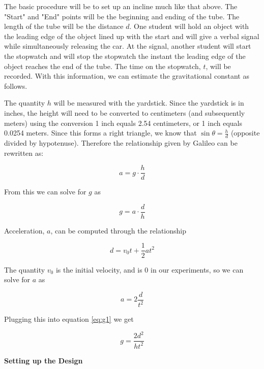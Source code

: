 \documentclass[12pt]{article}
\begin{document}
The basic procedure will be to set up an incline much like that above. The "Start" and "End" points will be the beginning and ending of the tube. The length of the tube will be the distance $d$. One student will hold an object with the leading edge of the object lined up with the start and will give a verbal signal while simultaneously releasing the car. At the signal, another student will start the stopwatch and will stop the stopwatch the instant the leading edge of the object reaches the end of the tube. The time on the stopwatch, $t$, will be recorded. With this information, we can estimate the gravitational constant as follows.

The quantity $h$ will be measured with the yardstick. Since the yardstick is in inches, the height will need to be converted to centimeters (and subsequently meters) using the conversion 1 inch equals 2.54 centimeters, or 1 inch equals 0.0254 meters. Since this forms a right triangle, we know that $\sin{\theta} = \frac{h}{d}$ (opposite divided by hypotenuse). Therefore the relationship given by Galileo can be rewritten as:

\begin{equation}
	a = g \cdot \frac{h}{d}
\end{equation}

\noindent From this we can solve for $g$ as

\begin{equation}
	g = a \cdot \frac{d}{h}
	\label{eq:g1}
\end{equation}

\noindent Acceleration, $a$, can be computed through the relationship

\begin{equation}
	d = v_0t + \frac{1}{2}at^2
\end{equation}

\noindent The quantity $v_0$ is the initial velocity, and is 0 in our experiments, so we can solve for $a$ as

\begin{equation}
	a = 2 \frac{d}{t^2}
\end{equation}

\noindent Plugging this into equation \ref{eq:g1} we get

\begin{equation}
	g = \frac{2d^2}{ht^2}
	\label{eq:g2}
\end{equation}

\newpage
\noindent
\textbf{Setting up the Design}
\end{document}
